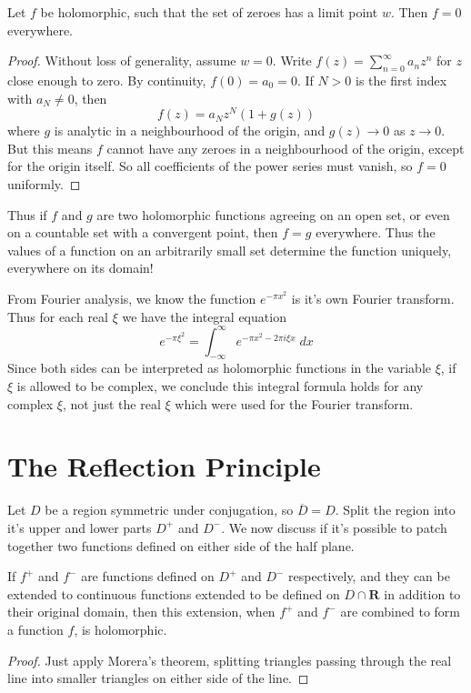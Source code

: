 \begin{theorem}
    Let $f$ be holomorphic, such that the set of zeroes has a limit point $w$. Then $f = 0$ everywhere.
\end{theorem}
\begin{proof}
    Without loss of generality, assume $w = 0$. Write $f(z) = \sum_{n = 0}^\infty a_n z^n$ for $z$ close enough to zero. By continuity, $f(0) = a_0 = 0$. If $N > 0$ is the first index with $a_N \neq 0$, then
    \[ f(z) = a_N z^N(1 + g(z)) \]
    where $g$ is analytic in a neighbourhood of the origin, and $g(z) \to 0$ as $z \to 0$. But this means $f$ cannot have any zeroes in a neighbourhood of the origin, except for the origin itself. So all coefficients of the power series must vanish, so $f = 0$ uniformly.
\end{proof}

Thus if $f$ and $g$ are two holomorphic functions agreeing on an open set, or even on a countable set with a convergent point, then $f = g$ everywhere. Thus the values of a function on an arbitrarily small set determine the function uniquely, everywhere on its domain!

\begin{example}
    From Fourier analysis, we know the function $e^{-\pi x^2}$ is it's own Fourier transform. Thus for each real $\xi$ we have the integral equation
    \[ e^{- \pi \xi^2} = \int_{-\infty}^\infty e^{- \pi x^2 - 2 \pi i \xi x}\; dx \]
    Since both sides can be interpreted as holomorphic functions in the variable $\xi$, if $\xi$ is allowed to be complex, we conclude this integral formula holds for any complex $\xi$, not just the real $\xi$ which were used for the Fourier transform.
\end{example}

\section{The Reflection Principle}

Let $D$ be a region symmetric under conjugation, so $\overline{D} = D$. Split the region into it's upper and lower parts $D^+$ and $D^-$. We now discuss if it's possible to patch together two functions defined on either side of the half plane.

\begin{theorem}
    If $f^+$ and $f^-$ are functions defined on $D^+$ and $D^-$ respectively, and they can be extended to continuous functions extended to be defined on $D \cap \mathbf{R}$ in addition to their original domain, then this extension, when $f^+$ and $f^-$ are combined to form a function $f$, is holomorphic.
\end{theorem}
\begin{proof}
    Just apply Morera's theorem, splitting triangles passing through the real line into smaller triangles on either side of the line.
\end{proof}

